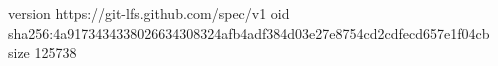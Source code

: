 version https://git-lfs.github.com/spec/v1
oid sha256:4a9173434338026634308324afb4adf384d03e27e8754cd2cdfecd657e1f04cb
size 125738
